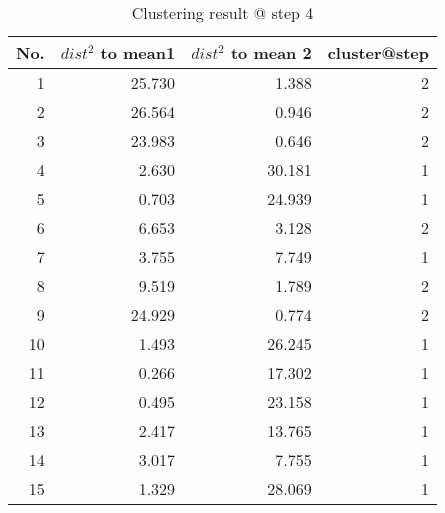 \begin{table}[htbp]
  \centering
  \caption{Clustering result @ step 4}
    \begin{tabular}{rrrr}
    \toprule
    No.   & $dist^2$ to mean1 & $dist^2$ to mean 2 & cluster@step \\
    \midrule
    1     & 25.730  & 1.388  & 2 \\
    2     & 26.564  & 0.946  & 2 \\
    3     & 23.983  & 0.646  & 2 \\
    4     & 2.630  & 30.181  & 1 \\
    5     & 0.703  & 24.939  & 1 \\
    6     & 6.653  & 3.128  & 2 \\
    7     & 3.755  & 7.749  & 1 \\
    8     & 9.519  & 1.789  & 2 \\
    9     & 24.929  & 0.774  & 2 \\
    10    & 1.493  & 26.245  & 1 \\
    11    & 0.266  & 17.302  & 1 \\
    12    & 0.495  & 23.158  & 1 \\
    13    & 2.417  & 13.765  & 1 \\
    14    & 3.017  & 7.755  & 1 \\
    15    & 1.329  & 28.069  & 1 \\
    \bottomrule
    \end{tabular}%
  \label{tab:cluster_a4}%
\end{table}%
